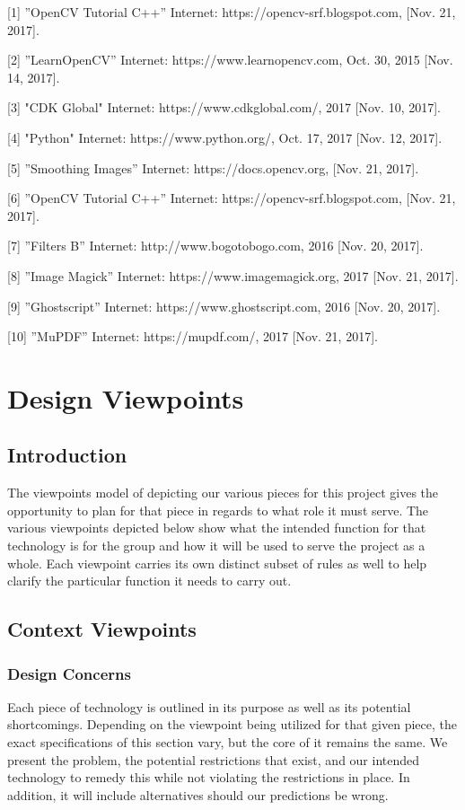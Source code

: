 \documentclass[onecolumn, draftclsnofoot,10pt, compsoc]{IEEEtran}
\begin{document}
[1] ”OpenCV Tutorial C++” Internet: https://opencv-srf.blogspot.com, [Nov. 21, 2017].

[2] ”LearnOpenCV” Internet: https://www.learnopencv.com, Oct. 30, 2015 [Nov. 14, 2017].

[3] "CDK Global" Internet: https://www.cdkglobal.com/, 2017 [Nov. 10, 2017].

[4] "Python" Internet: https://www.python.org/, Oct. 17, 2017 [Nov. 12, 2017].

[5] ”Smoothing Images” Internet: https://docs.opencv.org, [Nov. 21, 2017].

[6] ”OpenCV Tutorial C++” Internet: https://opencv-srf.blogspot.com, [Nov. 21, 2017].

[7] ”Filters B” Internet: http://www.bogotobogo.com, 2016 [Nov. 20, 2017].

[8] ”Image Magick” Internet: https://www.imagemagick.org, 2017 [Nov. 21, 2017].

[9] ”Ghostscript” Internet: https://www.ghostscript.com, 2016 [Nov. 20, 2017].

[10] ”MuPDF” Internet: https://mupdf.com/, 2017 [Nov. 21, 2017].

\section{Design Viewpoints}
\subsection{Introduction}
The viewpoints model of depicting our various pieces for this project gives the opportunity to plan for that piece in regards to what role it must serve. The various viewpoints depicted below show what the intended function for that technology is for the group and how it will be used to serve the project as a whole. Each viewpoint carries its own distinct subset of rules as well to help clarify the particular function it needs to carry out. 

\subsection{Context Viewpoints}
\subsubsection{Design Concerns}
Each piece of technology is outlined in its purpose as well as its potential shortcomings. Depending on the viewpoint being utilized for that given piece, the exact specifications of this section vary, but the core of it remains the same. We present the problem, the potential restrictions that exist, and our intended technology to remedy this while not violating the restrictions in place. In addition, it will include alternatives should our predictions be wrong.
\end{document}
